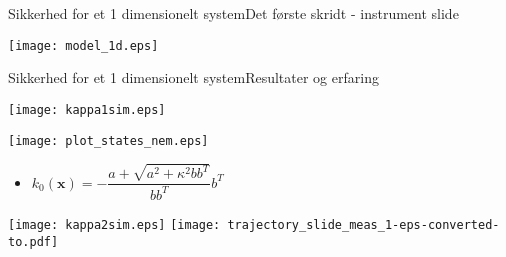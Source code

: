 \begin{frame}{Sikkerhed for et 1 dimensionelt system}{Det første skridt - instrument slide}
\begin{minipage}{0.35\textwidth}
\vspace*{0.2cm}
\hspace*{-0.5cm}
\texttt{[image: model\_1d.eps]}

\end{minipage}
\end{frame}


\begin{frame}{Sikkerhed for et 1 dimensionelt system}{Resultater og erfaring}
\begin{minipage}{0.48\textwidth}
\vspace*{-0.2cm}
\texttt{[image: kappa1sim.eps]}

\vspace{0.3cm}

\texttt{[image: plot\_states\_nem.eps]}

\begin{itemize}
	\item \scriptsize $k_0(\textbf{x}) = -\dfrac{a + \sqrt{a^2 + \kappa^2 b b^T}}{b b^T} b^T$
\end{itemize}
\end{minipage}
\begin{minipage}{0.48\textwidth}
\texttt{[image: kappa2sim.eps]}
\vspace*{0.05cm}
\texttt{[image: trajectory\_slide\_meas\_1-eps-converted-to.pdf]}

\end{minipage}
\end{frame}


